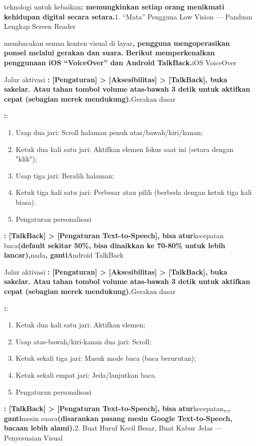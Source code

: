 
teknologi untuk kebaikan\textbf{: memungkinkan setiap orang menikmati kehidupan digital secara setara.}1. “Mata” Pengguna Low Vision — Panduan Lengkap Screen Reader


membacakan semua konten visual di layar\textbf{, pengguna mengoperasikan ponsel melalui gerakan dan suara. Berikut memperkenalkan penggunaan iOS “VoiceOver” dan Android TalkBack.}iOS VoiceOver

\begin{tcbinfo}{Jalur aktivasi}
\textbf{: [Pengaturan] > [Aksesibilitas] > [TalkBack], buka sakelar. Atau tahan tombol volume atas-bawah 3 detik untuk aktifkan cepat (sebagian merek mendukung).}Gerakan dasar

\textbf{:}:

\begin{enumerate}
  \item Usap dua jari: Scroll halaman penuh atas/bawah/kiri/kanan;
  \item Ketuk dua kali satu jari: Aktifkan elemen fokus saat ini (setara dengan "klik");
  \item Usap tiga jari: Beralih halaman;
  \item Ketuk tiga kali satu jari: Perbesar atau pilih (berbeda dengan ketuk tiga kali biasa).
  \item Pengaturan personalisasi
\end{enumerate}

\textbf{: [TalkBack] > [Pengaturan Text-to-Speech], bisa atur}kecepatan baca\textbf{(default sekitar 50\%, bisa dinaikkan ke 70-80\% untuk lebih lancar),}nada\textbf{, ganti}Android TalkBack

\end{tcbinfo}

\begin{tcbinfo}{Jalur aktivasi}
\textbf{: [Pengaturan] > [Aksesibilitas] > [TalkBack], buka sakelar. Atau tahan tombol volume atas-bawah 3 detik untuk aktifkan cepat (sebagian merek mendukung).}Gerakan dasar

\textbf{:}:

\begin{enumerate}
  \item Ketuk dua kali satu jari: Aktifkan elemen;
  \item Usap atas-bawah/kiri-kanan dua jari: Scroll;
  \item Ketuk sekali tiga jari: Masuk mode baca (baca berurutan);
  \item Ketuk sekali empat jari: Jeda/lanjutkan baca.
  \item Pengaturan personalisasi
\end{enumerate}

\textbf{: [TalkBack] > [Pengaturan Text-to-Speech], bisa atur}kecepatan\textbf{,},\textbf{, ganti}mesin suara\textbf{(disarankan pasang mesin Google Text-to-Speech, bacaan lebih alami).}2. Buat Huruf Kecil Besar, Buat Kabur Jelas — Penyesuaian Visual

\end{tcbinfo}

